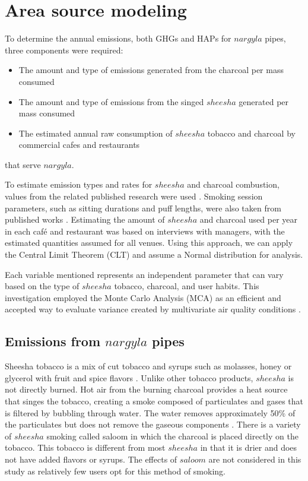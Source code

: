 \section{Area source modeling}
To determine the annual emissions, both GHGs and HAPs for $nargyla$ pipes, three components were required: 
\begin{itemize}
    \item The amount and type of emissions generated from the charcoal per mass consumed
    \item The amount and type of emissions from the singed $sheesha$ generated per mass consumed
    \item The estimated annual raw consumption of $sheesha$ tobacco and charcoal by commercial cafes and restaurants 
\end{itemize}
\noindent
that serve $nargyla$. 

To estimate emission types and rates for $sheesha$ and charcoal combustion, values from the related published research were used \citep{Akagi2011, Bhattacharya2002, Paciornik2006, Sepetdjian2010, USEPA1995}.  Smoking session parameters, such as sitting durations and puff lengths, were also taken from published works \citep{Eissenberg2009, Fromme2009, Mulla2015}.  Estimating the amount of $sheesha$ and charcoal used per year in each café and restaurant was based on interviews with managers, with the estimated quantities assumed for all venues. Using this approach, we can apply the Central Limit Theorem (CLT) and assume a Normal distribution for analysis.  

Each variable mentioned represents an independent parameter that can vary based on the type of $sheesha$ tobacco, charcoal, and user habits.  This investigation employed the Monte Carlo Analysis (MCA) as an efficient and accepted way to evaluate variance created by multivariate air quality conditions \citep{Freeman2017a, McVoy1979, Tan2014}.  

\subsection{Emissions from $nargyla$ pipes}

Sheesha tobacco is a mix of cut tobacco and syrups such as molasses, honey or glycerol with fruit and spice flavors \citep{Chaouachi2009}.  Unlike other tobacco products, $sheesha$ is not directly burned. Hot air from the burning charcoal provides a heat source that singes the tobacco, creating a smoke composed of particulates and gases \citep{Daher2010} that is filtered by bubbling through water.  The water removes approximately 50\% of the particulates but does not remove the gaseous components \citep{Becquemin2008}. There is a variety of $sheesha$ smoking called saloom in which the charcoal is placed directly on the tobacco. This tobacco is different from most $sheesha$ in that it is drier and does not have added flavors or syrups. The effects of $saloom$ are not considered in this study as relatively few users opt for this method of smoking.

